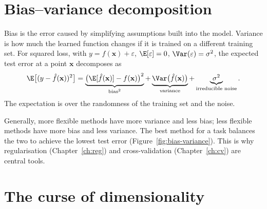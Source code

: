 \documentclass[a4paper, 12pt]{book}
\begin{document}

\section{Bias--variance decomposition}

Bias is the error caused by simplifying assumptions built into the model. Variance is
how much the learned function changes if it is trained on a different training set.
For squared loss, with $y = f(\mathbf{x}) + \varepsilon$,
$\E[\varepsilon]=0$, $\Var(\varepsilon)=\sigma^2$, the expected test error at a point
$\mathbf{x}$ decomposes as
\begin{align}
    \E\big[(y - \hat{f}(\mathbf{x}))^2\big]
    = \underbrace{\big(\E[\hat{f}(\mathbf{x})] - f(\mathbf{x})\big)^2}_{\text{bias}^2}
    + \underbrace{\Var\big(\hat{f}(\mathbf{x})\big)}_{\text{variance}}
    + \underbrace{\sigma^2}_{\text{irreducible noise}}.
\end{align}
The expectation is over the randomness of the training set and the noise.

Generally, more flexible methods have more variance and less bias; less flexible
methods have more bias and less variance. The best method for a task balances the two
to achieve the lowest test error (Figure~\ref{fig:bias-variance}). This is why
regularisation (Chapter~\ref{ch:reg}) and cross-validation
(Chapter~\ref{ch:cv}) are central tools.

\section{The curse of dimensionality}
\end{document}
